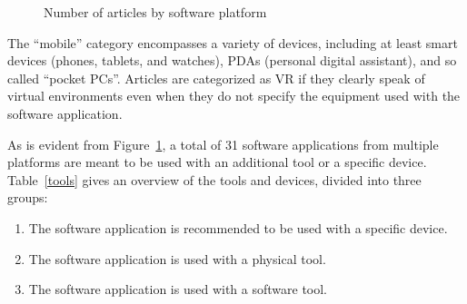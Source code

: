 \documentclass[utf8,english]{gradu3}
\begin{document}
\begin{figure}[thb]
  \centering
  \caption{Number of articles by software platform}
  \label{kuvaAlustat}
\end{figure}

The ``mobile'' category encompasses a variety of devices,
including at least smart devices (phones, tablets, and watches),
PDAs (personal digital assistant), and so called ``pocket PCs''.
Articles are categorized as VR if they clearly speak of virtual environments
even when they do not specify the equipment used with the software application.

As is evident from Figure~\ref{kuvaAlustat}, a total of 31 software applications from
multiple platforms are meant to be used with an additional tool or a specific device.
Table~\ref{tools} gives an overview of the tools and devices, divided into three groups:
\begin{enumerate}
  \item The software application is recommended to be used with a specific device.
  \item The software application is used with a physical tool.
  \item The software application is used with a software tool.
\end{enumerate}
\end{document}

